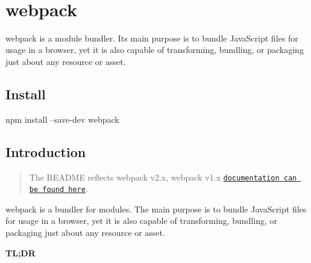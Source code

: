 \href{https://npmjs.com/package/webpack}{\tt } \href{https://nodejs.org}{\tt } \href{https://david-dm.org/webpack/webpack}{\tt } \href{https://travis-ci.org/webpack/webpack}{\tt } \href{https://ci.appveyor.com/project/sokra/webpack/branch/master}{\tt } \href{https://coveralls.io/r/webpack/webpack/}{\tt } \href{https://app.fossa.io/projects/git%2Bhttps%3A%2F%2Fgithub.com%2Fwebpack%2Fwebpack?ref=badge_shield}{\tt }

 \href{https://github.com/webpack/webpack}{\tt } ~\newline
 ~\newline
 \href{https://npmjs.com/package/webpack}{\tt } \href{https://opencollective.com/webpack#backer}{\tt } \href{https://opencollective.com/webpack#sponsors}{\tt } \href{https://gitter.im/webpack/webpack}{\tt } \section*{webpack}

 

 webpack is a module bundler. Its main purpose is to bundle Java\+Script files for usage in a browser, yet it is also capable of transforming, bundling, or packaging just about any resource or asset. 

 

\subsection*{Install}


\begin{DoxyCode}
npm install --save-dev webpack
\end{DoxyCode}


\subsection*{Introduction}

\begin{quote}
The R\+E\+A\+D\+ME reflects webpack v2.\+x, webpack v1.\+x \href{https://webpack.github.io/docs/?utm_source=github&utm_medium=readme&utm_campaign=top}{\tt documentation can be found here}. \end{quote}


webpack is a bundler for modules. The main purpose is to bundle Java\+Script files for usage in a browser, yet it is also capable of transforming, bundling, or packaging just about any resource or asset.

{\bfseries TL;DR}


